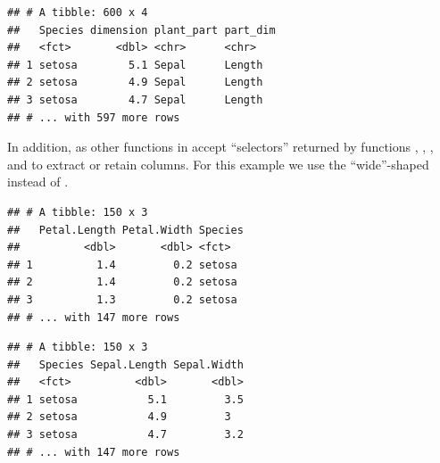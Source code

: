 \documentclass[krantz2]{krantz}\usepackage{knitr}
\begin{document}
\begin{knitrout}\footnotesize
{}\color{fgcolor}\begin{kframe}
\begin{alltt}
 \hlopt{-}
\end{alltt}
\begin{verbatim}
## # A tibble: 600 x 4
##   Species dimension plant_part part_dim
##   <fct>       <dbl> <chr>      <chr>
## 1 setosa        5.1 Sepal      Length
## 2 setosa        4.9 Sepal      Length
## 3 setosa        4.7 Sepal      Length
## # ... with 597 more rows
\end{verbatim}
\end{kframe}
\end{knitrout}

In addition,  as other functions in  accept ``selectors'' returned by functions , , , and  to extract or retain columns. For this example we use the ``wide''-shaped  instead of .

\begin{knitrout}\footnotesize
{}\color{fgcolor}\begin{kframe}
\begin{alltt}
 \hlopt{-}\hlstd{(}\hlstd{))}
\end{alltt}
\begin{verbatim}
## # A tibble: 150 x 3
##   Petal.Length Petal.Width Species
##          <dbl>       <dbl> <fct>
## 1          1.4         0.2 setosa
## 2          1.4         0.2 setosa
## 3          1.3         0.2 setosa
## # ... with 147 more rows
\end{verbatim}
\end{kframe}
\end{knitrout}

\begin{knitrout}\footnotesize
{}\color{fgcolor}\begin{kframe}
\begin{alltt}
 \hlstd{(}\hlstd{))}
\end{alltt}
\begin{verbatim}
## # A tibble: 150 x 3
##   Species Sepal.Length Sepal.Width
##   <fct>          <dbl>       <dbl>
## 1 setosa           5.1         3.5
## 2 setosa           4.9         3
## 3 setosa           4.7         3.2
## # ... with 147 more rows
\end{verbatim}
\end{kframe}
\end{knitrout}
\end{document}
